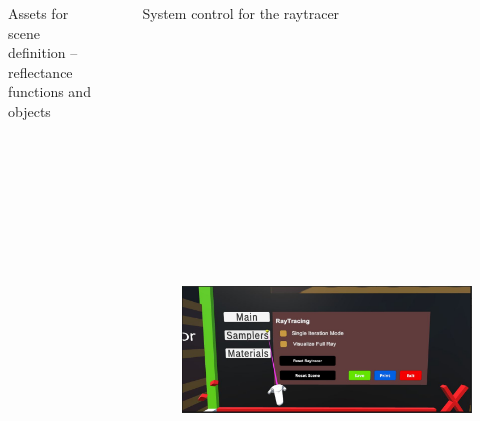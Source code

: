 \documentclass[final,hyperref={pdfpagelabels=false}]{beamer}
\begin{document}
\begin{frame}[t]
\begin{columns}[t]
\begin{column}{.4675\textwidth}
\begin{block}{Assets for scene definition -- reflectance functions and objects}

\end{block}


\end{column} %



\begin{column}{.02\textwidth}\end{column} %

\begin{column}{.465\textwidth}

\begin{block}{System control for the raytracer}
   \begin{figure}
   	  \includegraphics[height=16.5cm]{settings}
   \end{figure}
   

\end{block}
\end{column}
\end{columns}
\end{frame}
\end{document}
